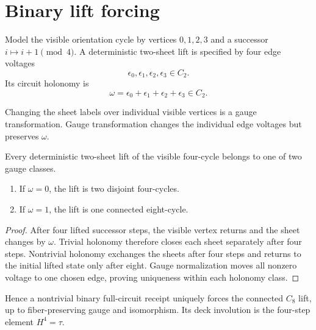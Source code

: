 \section{Binary lift forcing}

Model the visible orientation cycle by vertices \(0,1,2,3\) and a
successor \(i\mapsto i+1\pmod 4\). A deterministic two-sheet lift is
specified by four edge voltages
\[
\epsilon_0,\epsilon_1,\epsilon_2,\epsilon_3\in C_2.
\]
Its circuit holonomy is
\[
\omega=\epsilon_0+\epsilon_1+\epsilon_2+\epsilon_3\in C_2.
\]

Changing the sheet labels over individual visible vertices is a gauge
transformation. Gauge transformation changes the individual edge
voltages but preserves \(\omega\).

\begin{theorem}
Every deterministic two-sheet lift of the visible four-cycle belongs
to one of two gauge classes.
\begin{enumerate}
\item If \(\omega=0\), the lift is two disjoint four-cycles.
\item If \(\omega=1\), the lift is one connected eight-cycle.
\end{enumerate}
\end{theorem}

\begin{proof}
After four lifted successor steps, the visible vertex returns and the
sheet changes by \(\omega\). Trivial holonomy therefore closes each
sheet separately after four steps. Nontrivial holonomy exchanges the
sheets after four steps and returns to the initial lifted state only
after eight. Gauge normalization moves all nonzero voltage to one
chosen edge, proving uniqueness within each holonomy class.
\end{proof}

Hence a nontrivial binary full-circuit receipt uniquely forces the
connected \(C_8\) lift, up to fiber-preserving gauge and isomorphism.
Its deck involution is the four-step element \(H^4=\tau\).
